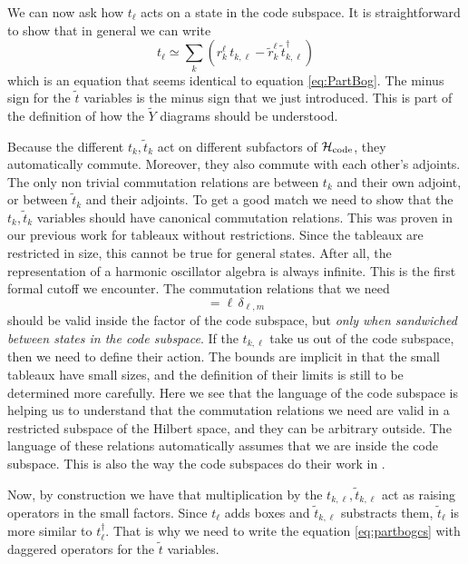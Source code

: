 \documentclass[12pt,nofootinbib, longbibliography]{revtex4-1}
\begin{document}
We can now ask how $t_\ell$ acts on a state in the code subspace. 
It is straightforward to show that in general we can write
\begin{equation}
t_\ell \simeq \sum_k \left(r_k^\ell \, t_{k,\ell} - \tilde r^\ell_k \, \tilde t^\dagger_{k, \ell}\right)\label{eq:partbogcs}
\end{equation}
which is an equation that seems identical to equation \eqref{eq:PartBog}. The minus sign for the $\tilde t$ variables is the minus sign that we just introduced. This is part of the definition of how the $\tilde Y$  diagrams should be understood.

Because the different $t_k, \tilde t _k$ act on different subfactors of ${\cal H}_{\rm{code}}$, they automatically commute. Moreover, they also commute with each other's adjoints. The only non trivial commutation relations are between $t_k$ and their own adjoint, or between $\tilde t _k$ and their adjoints.
To get a good match we need to show that the $t_k, \tilde t_k$ variables should have canonical commutation relations. This was proven in our previous work \cite{Berenstein:2017abm} for tableaux without restrictions. Since the tableaux are restricted in size, this cannot be true for general states. After all, the representation of a harmonic oscillator algebra is always infinite.
This is the first formal cutoff we encounter. The commutation relations that we need 
\begin{equation}
[t^\dagger_{k, \ell}, t_{k, m}] = \ell \, \delta_{\ell, m}
\end{equation}
should be valid inside the factor of the code subspace, but {\em only when sandwiched between states in the code subspace}. If the $t_{k,\ell}$ take us out of the code subspace, then
we need to define their action. The bounds are implicit in that the small tableaux have small sizes, and the definition of their limits is still to be determined more carefully.
Here we see that the language of the code subspace is helping us to understand that the commutation relations we need are valid in a restricted subspace of the Hilbert space, and they can be arbitrary outside. The language of these relations automatically assumes that we are inside the code subspace. This is also the way the code subspaces do their  work in \cite{Almheiri:2014lwa}.


Now, by construction we have that multiplication by the $t_{k,\ell}, \tilde t_{k,\ell}$ act as raising operators in the small factors. Since $t_{\ell}$ adds boxes and $\tilde t_{k,\ell}$ substracts them, $\tilde t_{\ell}$
is more similar to $t_{\ell}^\dagger$. That is why we need to write the equation \eqref{eq:partbogcs} with daggered operators for the $\tilde t$ variables.
\end{document}
